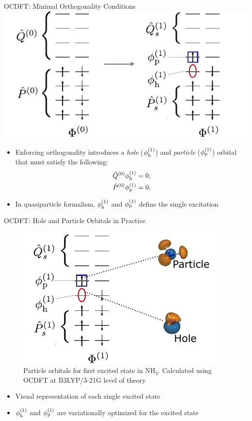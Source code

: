 \documentclass[t]{beamer}
\begin{document}
\begin{frame}{OCDFT: Minimal Orthogonality Conditions}
\centering
\includegraphics[width=0.6\linewidth]{hole_particle_orthogonality.pdf}
\begin{itemize}
\item Enforcing orthogonality introduces a \textit{hole} ($\phi_{\rm h}^{(1)}$) and \textit{particle} ($\phi_{\rm p}^{(1)}$) orbital that must satisfy the following:
\begin{align}
\label{eq:pq_conditions1}
\hat{Q}^{(0)}\phi_{\rm h}^{(1)} = 0,\\
\label{eq:pq_conditions2}
\hat{P}^{(0)}\phi_{\rm p}^{(1)} = 0,
\end{align}
\item In quasiparticle formalism, $\phi_{\rm h}^{(1)}$ and $\phi_{\rm p}^{(1)}$ define the single excitation
\end{itemize}
\end{frame}

\begin{frame}{OCDFT: Hole and Particle Orbitals in Practice}
\begin{figure}
\centering
\includegraphics{hole_particle_practice.pdf}
\caption*{Particle orbitals for first excited state in NH$_3$. Calculated using OCDFT at B3LYP/3-21G level of theory} 
\end{figure}
\begin{itemize}
\item Visual representation of each single excited state
\item $\phi_{\rm h}^{(1)}$ and $\phi_{\rm p}^{(1)}$ are variationally optimized for the excited state
\end{itemize}
\end{frame}
\end{document}
